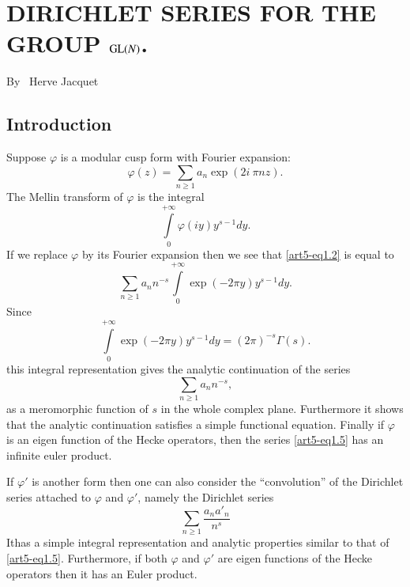\chapter{DIRICHLET SERIES FOR THE GROUP $\mathrm{GL}(N)$.}\label{art-5}

\begin{center}
{\large By~ Herve Jacquet}
\end{center}


\bigskip

\setcounter{pageoriginal}{154}
\section{Introduction}\label{art5-sec1}
\pageoriginale
Suppose $\varphi$ is a modular cusp form with Fourier expansion:
\begin{equation*}
\varphi(z)=\sum\limits_{n\geq 1}a_{n}\exp(2i\ \pi n z).\tag{1.1}\label{art5-eq1.1}
\end{equation*}
The Mellin transform of $\varphi$ is the integral
\begin{equation*}
\int\limits^{+\infty}_{0}\varphi(iy)y^{s-1}dy.\tag{1.2}\label{art5-eq1.2}
\end{equation*}
If we replace $\varphi$ by its Fourier expansion then we see that \eqref{art5-eq1.2} is equal to
\begin{equation*}
\sum\limits_{n\geq 1}a_{n}n^{-s}\int\limits^{+\infty}_{0}\exp (-2\pi y)y^{s-1}dy.\tag{1.3}\label{art5-eq1.3}
\end{equation*}
Since
\begin{equation*}
\int\limits_{0}^{+\infty}\exp(-2\pi y)y^{s-1}dy=(2\pi)^{-s}\Gamma(s).\tag{1.4}\label{art5-eq1.4}
\end{equation*}
this integral representation gives the analytic continuation of the series
\begin{equation*}
\sum\limits_{n\geq 1} a_{n}n^{-s},\tag{1.5}\label{art5-eq1.5}
\end{equation*}
as a meromorphic function of $s$ in the whole complex plane. Furthermore it shows that the analytic continuation satisfies a simple functional equation. Finally if $\varphi$ is an eigen function of the Hecke operators, then the series \eqref{art5-eq1.5} has an infinite euler product.

If $\varphi'$ is another form then one can also consider the ``convolution'' of the Dirichlet series attached to $\varphi$ and $\varphi'$, namely the Dirichlet series
\begin{equation*}
\sum\limits_{n\geq 1} \frac{a_{n}a'_{n}}{n^{s}}\tag{1.6}\label{art5-eq1.6}
\end{equation*}
It\pageoriginale has a simple integral representation and analytic properties similar to that of \eqref{art5-eq1.5}. Furthermore, if both $\varphi$ and $\varphi'$ are eigen functions of the Hecke operators then it has an Euler product.

